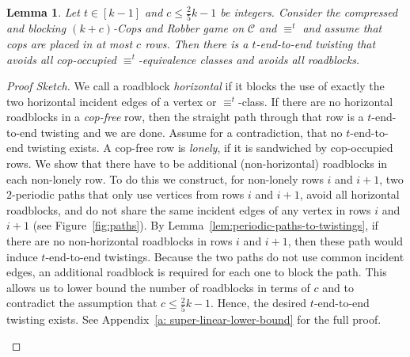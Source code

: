 \documentclass[10pt,a4paper]{article}
\newcommand{\defining}[1]{\emph{#1}}
\newcommand{\comp}{\equiv}
\newcommand{\grid}{\mathcal{C}}
\newtheorem{lemma}[theorem]{Lemma}
\newcommand{\ifAppendix}[1]{#1}
\begin{document}
\begin{lemma}
        \label{lem:no-separator-with-too-many-roadblocks}
        Let $t \in [k-1]$ and $c \leq \frac{2}{5}k-1$ be integers.
        Consider the compressed and blocking $(k + c)$-Cops and Robber
        game on $\grid$ and $\comp^t$
        and assume that cops are placed in at most $c$ rows. 
        Then there is a $t$\nobreakdash-end-to-end twisting
        that avoids all cop-occupied $\comp^t$\nobreakdash-equivalence classes
        and avoids all roadblocks.
        \end{lemma}
\begin{proof}[Proof Sketch]
        We call a roadblock \defining{horizontal} 
        if it blocks the use of exactly the two horizontal incident edges of a vertex or $\comp^t$-class.
        If there are no horizontal roadblocks in a \defining{cop-free} row,
        then the straight path through that row is a 
        $t$-end-to-end twisting and we are done. Assume for a contradiction, that no $t$-end-to-end twisting exists.
        A cop-free row is \defining{lonely},
        if it is sandwiched by cop-occupied rows.
        We show that there have to be additional (non-horizontal) roadblocks in each  non-lonely row.
        To do this we construct, for non-lonely rows $i$ and $i+1$, two $2$-periodic paths that only use vertices from rows $i$ and $i+1$,
        avoid all horizontal roadblocks, and
        do not share the same incident edges of any vertex in rows $i$ and $i+1$ (see Figure~\ref{fig:paths}).
        By Lemma~\ref{lem:periodic-paths-to-twistings}, if there are no non-horizontal roadblocks in rows $i$ and $i+1$, then
        these path would induce $t$-end-to-end twistings. 
        Because the two paths do not use common incident edges,
         an additional roadblock is required for each one to block the path.
         This allows us to lower bound the number of roadblocks in terms of $c$ and to contradict the assumption that
         $c \leq \frac{2}{5}k - 1$.
         Hence, the desired $t$-end-to-end twisting exists. \ifAppendix{See Appendix~\ref{a: super-linear-lower-bound} for the full proof.} \qedhere
        
        \begin{figure}
                \centering 
\end{figure}
\end{proof}
\end{document}

